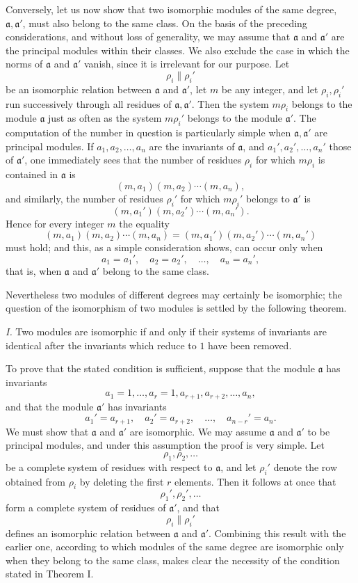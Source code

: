 Conversely, let us now show that two isomorphic modules of the same degree, $\mathfrak a,\mathfrak a'$, must also belong to the same class. On the basis of the preceding considerations, and without loss of generality, we may assume that $\mathfrak a$ and $\mathfrak a'$ are the principal modules within their classes. We also exclude the case in which the norms of $\mathfrak a$ and $\mathfrak a'$ vanish, since it is irrelevant for our purpose. Let
\[
 \rho_i\parallel \rho_i'
\]
be an isomorphic relation between $\mathfrak a$ and $\mathfrak a'$, let $m$ be any integer, and let $\rho_i,\rho_i'$ run successively through all residues of $\mathfrak a,\mathfrak a'$. Then the system $m\rho_i$ belongs to the module $\mathfrak a$ just as often as the system $m\rho_i'$ belongs to the module $\mathfrak a'$. The computation of the number in question is particularly simple when $\mathfrak a,\mathfrak a'$ are principal modules. If $a_1,a_2,\ldots,a_n$ are the invariants of $\mathfrak a$, and $a_1',a_2',\ldots,a_n'$ those of $\mathfrak a'$, one immediately sees that the number of residues $\rho_i$ for which $m\rho_i$ is contained in $\mathfrak a$ is
\[
 (m,a_1)(m,a_2)\cdots(m,a_n),
\]
and similarly, the number of residues $\rho_i'$ for which $m\rho_i'$ belongs to $\mathfrak a'$ is
\[
 (m,a_1')(m,a_2')\cdots(m,a_n').
\]
Hence for every integer $m$ the equality
\[
 (m,a_1)(m,a_2)\cdots(m,a_n)=(m,a_1')(m,a_2')\cdots(m,a_n')
\]
must hold; and this, as a simple consideration shows, can occur only when
\[
 a_1=a_1',\quad a_2=a_2',\quad\ldots,\quad a_n=a_n',
\]
that is, when $\mathfrak a$ and $\mathfrak a'$ belong to the same class.

Nevertheless two modules of different degrees may certainly be isomorphic; the question of the isomorphism of two modules is settled by the following theorem.

\emph{I.} Two modules are isomorphic if and only if their systems of invariants are identical after the invariants which reduce to $1$ have been removed.

To prove that the stated condition is sufficient, suppose that the module $\mathfrak a$ has invariants
\[
 a_1=1,\ldots,a_r=1,a_{r+1},a_{r+2},\ldots,a_n,
\]
and that the module $\mathfrak a'$ has invariants
\[
 a_1'=a_{r+1},\quad a_2'=a_{r+2},\quad\ldots,\quad a_{n-r}'=a_n.
\]
We must show that $\mathfrak a$ and $\mathfrak a'$ are isomorphic. We may assume $\mathfrak a$ and $\mathfrak a'$ to be principal modules, and under this assumption the proof is very simple. Let
\[
 \rho_1,\rho_2,\ldots
\]
be a complete system of residues with respect to $\mathfrak a$, and let $\rho_i'$ denote the row obtained from $\rho_i$ by deleting the first $r$ elements. Then it follows at once that
\[
 \rho_1',\rho_2',\ldots
\]
form a complete system of residues of $\mathfrak a'$, and that
\[
 \rho_i\parallel\rho_i'
\]
defines an isomorphic relation between $\mathfrak a$ and $\mathfrak a'$. Combining this result with the earlier one, according to which modules of the same degree are isomorphic only when they belong to the same class, makes clear the necessity of the condition stated in Theorem I.

